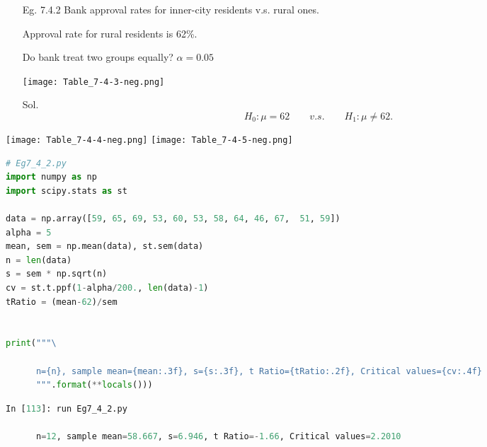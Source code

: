 \begin{frame}
	\begin{enumerate}
		\item[Eg. \small 7.4.2] Bank approval rates for inner-city residents v.s. rural ones.\\
		\item[] Approval rate for rural residents is 62\%.\\
		\item[] Do bank treat two groups equally? $\alpha=0.05$
			\begin{center}
				\texttt{[image: Table\_7-4-3-neg.png]}
			\end{center}
		\vfill
		\item[Sol.]
			\[
			H_0: \mu = 62\qquad v.s. \qquad H_1: \mu \ne 62.
			\]
	\end{enumerate}
\end{frame}
\begin{frame}
\centering
\texttt{[image: Table\_7-4-4-neg.png]}
\vfill
\texttt{[image: Table\_7-4-5-neg.png]}
\end{frame}
\begin{frame}[fragile]
\begin{lstlisting}[language=Python]
# Eg7_4_2.py
import numpy as np
import scipy.stats as st

data = np.array([59, 65, 69, 53, 60, 53, 58, 64, 46, 67,  51, 59])
alpha = 5
mean, sem = np.mean(data), st.sem(data)
n = len(data)
s = sem * np.sqrt(n)
cv = st.t.ppf(1-alpha/200., len(data)-1)
tRatio = (mean-62)/sem


print("""\

      n={n}, sample mean={mean:.3f}, s={s:.3f}, t Ratio={tRatio:.2f}, Critical values={cv:.4f}
      """.format(**locals()))
\end{lstlisting}
\begin{lstlisting}[language=Python]
In [113]: run Eg7_4_2.py

      n=12, sample mean=58.667, s=6.946, t Ratio=-1.66, Critical values=2.2010

\end{lstlisting}
\end{frame}

